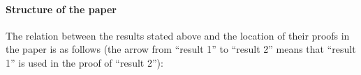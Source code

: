 \documentclass[leqno,a4paper,12pt]{article}
\theoremstyle{definition}
\begin{document}
\paragraph{Structure of the paper}
The relation between the results stated above and the location of their proofs in the paper is as follows (the arrow from ``result 1'' to ``result 2'' means that ``result 1'' is used in the proof of ``result 2''):
\end{document}
